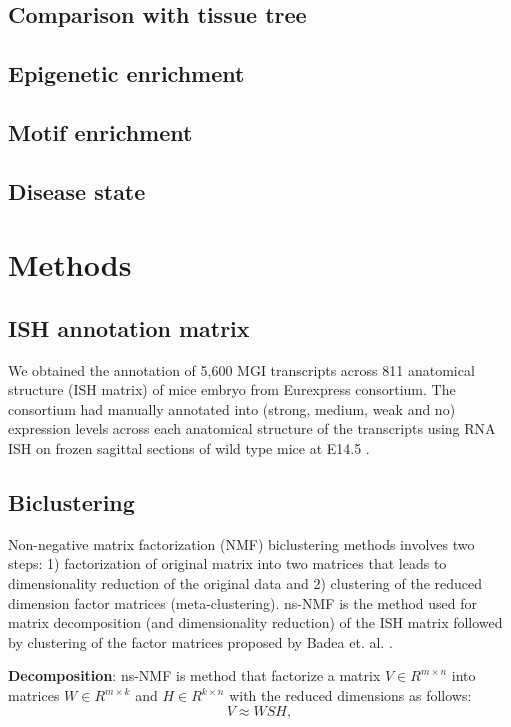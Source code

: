 \documentclass{article}
\begin{document}
\subsection{Comparison with tissue tree}

\subsection{Epigenetic enrichment}

\subsection{Motif enrichment}

\subsection{Disease state}


\section{Methods}
\subsection{ISH annotation matrix}
We obtained the annotation of 5,600 MGI transcripts across 811 anatomical structure (ISH matrix) of mice 
embryo from Eurexpress consortium. The consortium had manually annotated into (strong, medium, weak and no) 
expression levels across each anatomical structure of the transcripts using RNA ISH on frozen sagittal 
sections of wild type mice at E14.5 \cite{Diez-Roux2011a}. 

\subsection{Biclustering}
Non-negative matrix factorization (NMF) biclustering methods involves two steps: 1) factorization of original matrix into two
matrices that leads to dimensionality
reduction of the original data and 2) clustering of the reduced dimension factor matrices (meta-clustering). 
ns-NMF is the method used for matrix decomposition (and dimensionality reduction)
of the ISH matrix followed by clustering of the factor matrices proposed by Badea et. al. \cite{badea2007stable}.

\textbf{Decomposition}: ns-NMF is method that factorize a matrix $V \in R^{m\times n}$ into matrices
$W\in R^{m\times k}$ and $H \in R^{k \times n}$ with the reduced dimensions as follows:
\begin{equation}
    V \approx WSH,
\end{equation}
\end{document}
